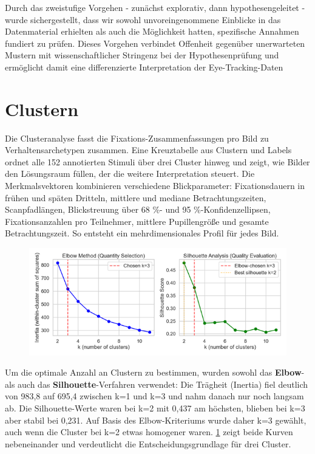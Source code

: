\documentclass[
    language=german, %
    thesis=seminar, %
    supervisor=postdoc, %
    multiauthor=true, %
    ]{settings/csssa-thesis}
\begin{document}
Durch das zweistufige Vorgehen - zunächst explorativ, dann hypothesengeleitet - wurde sichergestellt,
dass wir sowohl unvoreingenommene Einblicke in das Datenmaterial erhielten als auch die Möglichkeit hatten,
spezifische Annahmen fundiert zu prüfen. Dieses Vorgehen verbindet Offenheit gegenüber unerwarteten Mustern
mit wissenschaftlicher Stringenz bei der Hypothesenprüfung und ermöglicht damit eine differenzierte
Interpretation der Eye-Tracking-Daten

\section{Clustern}
Die Clusteranalyse fasst die Fixations-Zusammenfassungen pro Bild zu Verhaltensarchetypen zusammen. Eine Kreuztabelle aus Clustern und Labels ordnet alle 152 annotierten Stimuli über drei Cluster hinweg und zeigt, wie Bilder den Lösungsraum füllen, der die weitere Interpretation steuert.
Die Merkmalsvektoren kombinieren verschiedene Blickparameter: Fixationsdauern in frühen und späten Dritteln, mittlere und mediane Betrachtungszeiten, Scanpfadlängen, Blickstreuung über 68 \%- und 95 \%-Konfidenzellipsen, Fixationsanzahlen pro Teilnehmer, mittlere Pupillengrö{\ss}e und gesamte Betrachtungszeit. So entsteht ein mehrdimensionales Profil für jedes Bild. 

\begin{figure}[h]
    \centering
    \includegraphics[width=\linewidth,height=0.8\textheight,keepaspectratio]{figures/Abb1.png}
    \caption{}
    \label{fig:cluster1}
\end{figure}
 
Um die optimale Anzahl an Clustern zu bestimmen, wurden sowohl das \textbf{Elbow}- als auch das \textbf{Silhouette}-Verfahren verwendet: Die Trägheit (Inertia) fiel deutlich von 983,8 auf 695,4 zwischen k=1 und k=3 und nahm danach nur noch langsam ab. Die Silhouette-Werte waren bei k=2 mit 0,437 am höchsten, blieben bei k=3 aber stabil bei 0,231. Auf Basis des Elbow-Kriteriums wurde daher k=3 gewählt, auch wenn die Cluster bei k=2 etwas homogener waren. \ref{fig:cluster1} zeigt beide Kurven nebeneinander und verdeutlicht die Entscheidungsgrundlage für drei Cluster.
\end{document}
